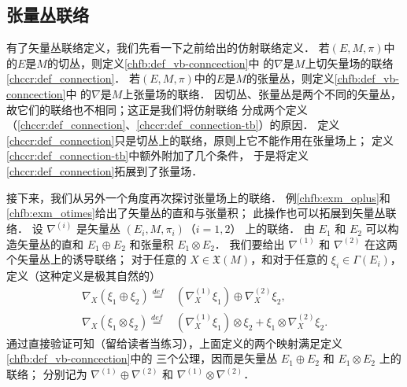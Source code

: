 \subsection{张量丛联络}

有了矢量丛联络定义，我们先看一下之前给出的仿射联络定义．
若$(E,M,\pi)$中的$E$是$M$的切丛，则定义\ref{chfb:def_vb-conncection}中
的$\nabla$是$M$上切矢量场的联络\ref{chccr:def_connection}．
若$(E,M,\pi)$中的$E$是$M$的张量丛，则定义\ref{chfb:def_vb-conncection}中
的$\nabla$是$M$上张量场的联络．
因切丛、张量丛是两个不同的矢量丛，故它们的联络也不相同；这正是我们将仿射联络
分成两个定义（\ref{chccr:def_connection}、\ref{chccr:def_connection-tb}）的原因．
定义\ref{chccr:def_connection}只是切丛上的联络，原则上它不能作用在张量场上；
定义\ref{chccr:def_connection-tb}中额外附加了几个条件，
于是将定义\ref{chccr:def_connection}拓展到了张量场．



接下来，我们从另外一个角度再次探讨张量场上的联络．
例\ref{chfb:exm_oplus}和\ref{chfb:exm_otimes}给出了矢量丛的直和与张量积；
此操作也可以拓展到矢量丛联络．
设 $\nabla^{(i)}$ 是矢量丛 $(E_i, M,\pi_i)$（$i=1,2$） 上的联络． 
由 $E_1$ 和 $E_2$ 可以构造矢量丛的直和 $E_1 \oplus E_2$ 和张量积 $E_1 \otimes E_2$．
我们要给出 $\nabla^{(1)}$ 和 $\nabla^{(2)}$ 在这两个矢量丛上的诱导联络；
对于任意的 $X \in \mathfrak{X}(M)$，和对于任意的 $\xi_i \in \Gamma(E_i)$，
定义（这种定义是极其自然的）
\begin{align}
    \nabla_X\left(\xi_1 \oplus \xi_2\right)\overset{def}{=}&
    \left(\nabla_X^{(1)} \xi_1\right) \oplus \nabla_X^{(2)} \xi_2, \label{chfb:eqn_opcon} \\
    \nabla_X\left(\xi_1 \otimes \xi_2\right)\overset{def}{=}& \left(\nabla_X^{(1)} \xi_1\right) \otimes 
    \xi_2+\xi_1 \otimes \nabla_X^{(2)} \xi_2 . \label{chfb:eqn_otcon}
\end{align}
通过直接验证可知（留给读者当练习），上面定义的两个映射满足定义\ref{chfb:def_vb-conncection}中的
三个公理，因而是矢量丛 $E_1 \oplus E_2$ 和 $E_1 \otimes E_2$ 上的联络；
分别记为 $\nabla^{(1)} \oplus \nabla^{(2)}$ 和 $\nabla^{(1)} \otimes \nabla^{(2)}$．

